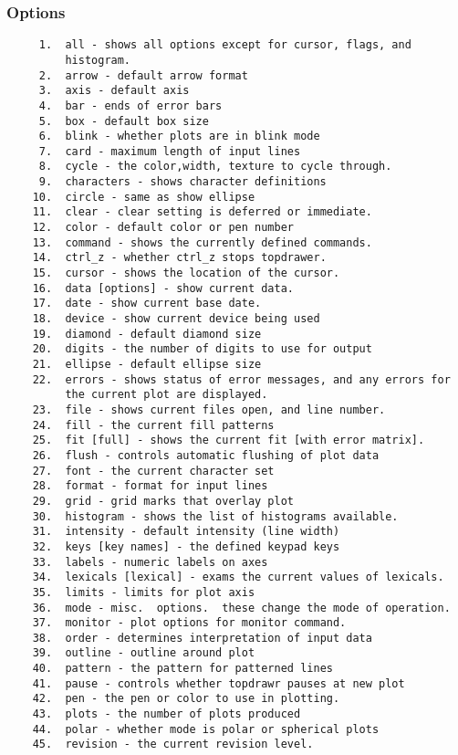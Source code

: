 \subsubsection{Options}
\begin{verbatim}
     1.  all - shows all options except for cursor, flags, and
         histogram.  
     2.  arrow - default arrow format 
     3.  axis - default axis 
     4.  bar - ends of error bars 
     5.  box - default box size 
     6.  blink - whether plots are in blink mode 
     7.  card - maximum length of input lines 
     8.  cycle - the color,width, texture to cycle through.  
     9.  characters - shows character definitions 
    10.  circle - same as show ellipse 
    11.  clear - clear setting is deferred or immediate.  
    12.  color - default color or pen number 
    13.  command - shows the currently defined commands.  
    14.  ctrl_z - whether ctrl_z stops topdrawer.  
    15.  cursor - shows the location of the cursor.  
    16.  data [options] - show current data.  
    17.  date - show current base date.  
    18.  device - show current device being used 
    19.  diamond - default diamond size 
    20.  digits - the number of digits to use for output 
    21.  ellipse - default ellipse size 
    22.  errors - shows status of error messages, and any errors for
         the current plot are displayed.  
    23.  file - shows current files open, and line number.  
    24.  fill - the current fill patterns 
    25.  fit [full] - shows the current fit [with error matrix].  
    26.  flush - controls automatic flushing of plot data 
    27.  font - the current character set 
    28.  format - format for input lines 
    29.  grid - grid marks that overlay plot 
    30.  histogram - shows the list of histograms available.  
    31.  intensity - default intensity (line width) 
    32.  keys [key names] - the defined keypad keys 
    33.  labels - numeric labels on axes 
    34.  lexicals [lexical] - exams the current values of lexicals.  
    35.  limits - limits for plot axis 
    36.  mode - misc.  options.  these change the mode of operation.  
    37.  monitor - plot options for monitor command.  
    38.  order - determines interpretation of input data 
    39.  outline - outline around plot 
    40.  pattern - the pattern for patterned lines 
    41.  pause - controls whether topdrawr pauses at new plot 
    42.  pen - the pen or color to use in plotting.  
    43.  plots - the number of plots produced 
    44.  polar - whether mode is polar or spherical plots 
    45.  revision - the current revision level.  

\end{verbatim}
